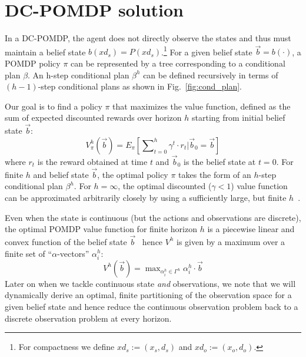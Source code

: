 \documentclass{article} %
\begin{document}
\section{DC-POMDP solution}

In a DC-POMDP, the agent does not directly observe the states and thus
must maintain a belief state $b(xd_s) = P(xd_s)$.\footnote{For
compactness we define $xd_s := (x_s,d_s)$ and $xd_o:=(x_o,d_o)$.}  For a
given belief state $\vec{b} = b(\cdot)$, a POMDP policy $\pi$ can be
represented by a tree corresponding to a conditional plan $\beta$.  An
h-step conditional plan $\beta^h$ can be defined recursively in terms
of $(h-1)$-step conditional plans as shown in
Fig.~\ref{fig:cond_plan}.

Our goal is to find a policy $\pi$ that maximizes the value function,
defined as the sum of expected discounted rewards over horizon $h$
starting from initial belief state $\vec{b}$:
\begin{equation}
V^h_\pi(\vec{b}) = E_{\pi} \left[ \sum\nolimits_{t=0}^{h} \gamma^t \cdot r_t \Big| \vec{b}_0 = \vec{b} \right]
\end{equation}
where $r_t$ is the reward obtained at time $t$ and $\vec{b}_0$ is the
belief state at $t=0$.  For finite $h$ and belief state $\vec{b}$, the
optimal policy $\pi$ takes the form of an $h$-step conditional plan
$\beta^h$.  For $h = \infty$, the optimal discounted ($\gamma < 1$)
value function can be approximated arbitrarily closely by using
a sufficiently large, but finite $h$~\cite{kaebling}.  

Even when the state is continuous (but the actions and observations
are discrete), 
the optimal POMDP value function for finite horizon $h$ is a piecewise linear
and convex function of the belief state $\vec{b}$~\cite{Perseus_cont} hence 
$V^h$ is given by a maximum over a finite set of
``$\alpha$-vectors'' $\alpha^h_i$:
\begin{equation}
V^h(\vec{b}) = \max\nolimits_{\alpha^h_i \in \Gamma^h} \alpha^h_i \cdot \vec{b}
\end{equation}
Later on when we tackle continuous state \emph{and} observations,
we note that we will dynamically derive an optimal, 
finite partitioning of the observation
space for a given belief state and hence reduce the continuous
observation problem back to a discrete observation problem at every
horizon.  
\end{document}
